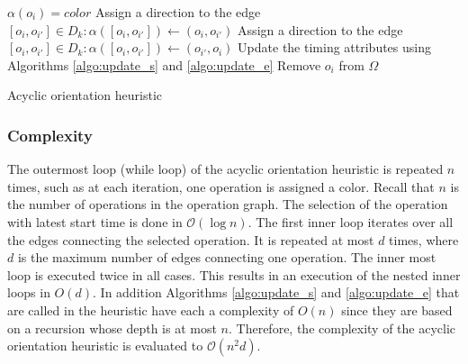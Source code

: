 \begin{algorithm}[!htp]
{{{								%
			}
			$\alpha(o_i)=color$\;
			{
				{
					Assign a direction to the edge $[o_i,o_{i'}] \in D_k: \alpha([o_i,o_{i'}])\leftarrow (o_i,o_{i'})$
				}
				\Else
				{
					Assign a direction to the edge $[o_i,o_{i'}] \in D_k: \alpha([o_i,o_{i'}])\leftarrow (o_{i'},o_i)$
				}
			}
			Update the timing attributes using Algorithms \ref{algo:update_s} and \ref{algo:update_e}\;
			Remove $o_i$ from $\Omega$\;
		}
	}
	
 
	\caption{Acyclic orientation heuristic}
	\label{algo:ao}
\end{algorithm}

\subsubsection{Complexity}

The outermost loop (while loop) of the acyclic orientation heuristic is repeated $n$ times, such as at each iteration, one operation is assigned a color. Recall that $n$ is the number of operations in the operation graph. The selection of the operation with latest start time is done in $\mathcal{O}(\log{}n)$. The first inner loop iterates over all the edges connecting the selected operation. It is repeated at most $d$ times, where $d$ is the maximum number of edges connecting one operation. The inner most loop is executed twice in all cases. This results in an execution of the nested inner loops in $O(d)$. In addition Algorithms \ref{algo:update_s} and \ref{algo:update_e} that are called in the heuristic have each a complexity of $O(n)$ since they are based on a recursion whose depth is at most $n$. Therefore, the complexity of the acyclic orientation heuristic is evaluated to $\mathcal{O}(n^2d)$.  


%
%

